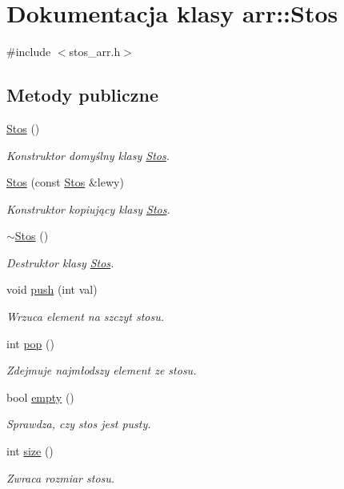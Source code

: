 \hypertarget{classarr_1_1_stos}{\section{Dokumentacja klasy arr\-:\-:Stos}
\label{classarr_1_1_stos}
}


{\ttfamily \#include $<$stos\-\_\-arr.\-h$>$}

\subsection*{Metody publiczne}
\begin{DoxyCompactItemize}
\item 
\hyperlink{classarr_1_1_stos_acc173736bd233091fe1205c7b2ad08e3}{Stos} ()
\begin{DoxyCompactList}\small\item\em Konstruktor domyślny klasy \hyperlink{classarr_1_1_stos}{Stos}. \end{DoxyCompactList}\item 
\hyperlink{classarr_1_1_stos_a3fa4c0909a0a8af714a7a41925c9bfc4}{Stos} (const \hyperlink{classarr_1_1_stos}{Stos} \&lewy)
\begin{DoxyCompactList}\small\item\em Konstruktor kopiujący klasy \hyperlink{classarr_1_1_stos}{Stos}. \end{DoxyCompactList}\item 
\hyperlink{classarr_1_1_stos_aab930de62382058082057237c0651c85}{$\sim$\-Stos} ()
\begin{DoxyCompactList}\small\item\em Destruktor klasy \hyperlink{classarr_1_1_stos}{Stos}. \end{DoxyCompactList}\item 
void \hyperlink{classarr_1_1_stos_a818b45b7e1133cf8666a8996795823a6}{push} (int val)
\begin{DoxyCompactList}\small\item\em Wrzuca element na szczyt stosu. \end{DoxyCompactList}\item 
int \hyperlink{classarr_1_1_stos_a3d8fd4cebbcc8eb5aed6bfe15e1b86d8}{pop} ()
\begin{DoxyCompactList}\small\item\em Zdejmuje najmłodszy element ze stosu. \end{DoxyCompactList}\item 
bool \hyperlink{classarr_1_1_stos_aa65aee46af4fbfe791b7419d9e2dc2d1}{empty} ()
\begin{DoxyCompactList}\small\item\em Sprawdza, czy stos jest pusty. \end{DoxyCompactList}\item 
int \hyperlink{classarr_1_1_stos_a7f40cb3055b25794dfd484e6e8bd4822}{size} ()
\begin{DoxyCompactList}\small\item\em Zwraca rozmiar stosu. \end{DoxyCompactList}\end{DoxyCompactItemize}
